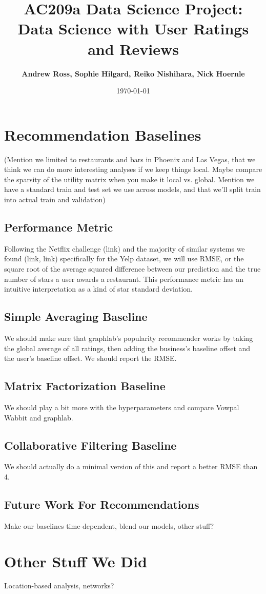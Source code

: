 \documentclass[11pt]{article}
\title{
\vspace{1cm}
\textmd{\textbf{AC209a Data Science Project: Data Science with User Ratings and Reviews}}\\
}
\author{\textbf{Andrew Ross, Sophie Hilgard, Reiko Nishihara, Nick Hoernle}}
\date{\today} %
\begin{document}
\maketitle

\section*{Recommendation Baselines}

\par (Mention we limited to restaurants and bars in Phoenix and Las Vegas, that we think we can do more interesting analyses if we keep things local. Maybe compare the sparsity of the utility matrix when you make it local vs. global. Mention we have a standard train and test set we use across models, and that we'll split train into actual train and validation)

\subsection*{Performance Metric}

\par Following the Netflix challenge (link) and the majority of similar systems we found (link, link) specifically for the Yelp dataset, we will use RMSE, or the square root of the average squared difference between our prediction and the true number of stars a user awards a restaurant. This performance metric has an intuitive interpretation as a kind of star standard deviation.

\subsection*{Simple Averaging Baseline}

\par We should make sure that graphlab's popularity recommender works by taking the global average of all ratings, then adding the business's baseline offset and the user's baseline offset. We should report the RMSE.

\subsection*{Matrix Factorization Baseline}

\par We should play a bit more with the hyperparameters and compare Vowpal Wabbit and graphlab.

\subsection*{Collaborative Filtering Baseline}

\par We should actually do a minimal version of this and report a better RMSE than 4.

\subsection*{Future Work For Recommendations}

\par Make our baselines time-dependent, blend our models, other stuff?

\section*{Other Stuff We Did}

\par Location-based analysis, networks?
\end{document}

